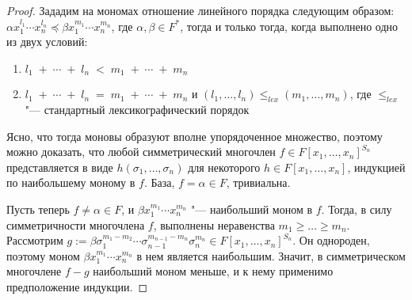 \begin{proof}
	Зададим на мономах отношение линейного порядка следующим образом: $\alpha x_1^{l_1}\dotsm x_n^{l_n} \preccurlyeq \beta x_1^{m_1}\dotsm x_n^{m_n}$, где $\alpha, \beta \in F^*$, тогда и только тогда, когда выполнено одно из двух условий:
	\begin{enumerate}
		\item $l_1 \;\! + \;\! \dotsb \;\! + \;\! l_n \;\! < \;\! m_1 \;\! + \;\! \dotsb \;\! + \;\! m_n$
		\item $l_1 \;\! + \;\! \dotsb \;\! + \;\! l_n \;\! = \;\! m_1 \;\! + \;\! \dotsb \;\! + \;\! m_n$ и $(l_1, \dotsc, l_n) \le_{lex} (m_1, \dotsc, m_n)$, где $\le_{lex}$ "--- стандартный лексикографический порядок
	\end{enumerate}
	
	Ясно, что тогда моновы образуют вполне упорядоченное множество, поэтому можно доказать, что любой симметрический многочлен $f \in F[x_1, \dotsc, x_n]^{S_n}$ представляется в виде $h(\sigma_1, \dotsc, \sigma_n)$ для некоторого $h \in F[x_1, \dotsc, x_n]$, индукцией по наибольшему моному в $f$. База, $f = \alpha \in F$, тривиальна.
	
	Пусть теперь $f \ne \alpha \in F$, и $\beta x_1^{m_1}\dotsm x_n^{m_n}$ "--- наибольший моном в $f$. Тогда, в силу симметричности многочлена $f$, выполнены неравенства $m_1 \ge \dotsc \ge m_n$. Рассмотрим $g := \beta\sigma_1^{m_1 - m_2}\dotsm\sigma_{n - 1}^{m_{n - 1} - m_n}\sigma_n^{m_n} \in F[x_1, \dotsc, x_n]^{S_n}$. Он однороден, поэтому моном $\beta x_1^{m_1}\dotsm x_n^{m_n}$ в нем является наибольшим. Значит, в симметрическом многочлене $f - g$ наибольший моном меньше, и к нему применимо предположение индукции.
\end{proof}

